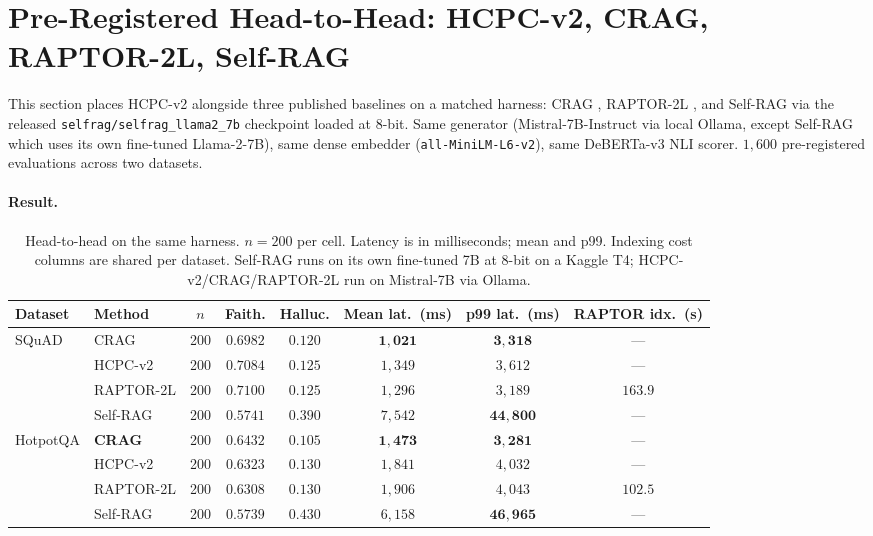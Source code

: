 \section{Pre-Registered Head-to-Head: HCPC-v2, CRAG, RAPTOR-2L, Self-RAG}
\label{sec:headtohead}

This section places HCPC-v2 alongside three published baselines on
a matched harness:
CRAG \citep{yan2024crag},
RAPTOR-2L \citep{sarthi2024raptor},
and Self-RAG via the released \texttt{selfrag/selfrag\_llama2\_7b}
checkpoint \citep{asai2024selfrag} loaded at 8-bit. Same generator
(Mistral-7B-Instruct via local Ollama, except Self-RAG which uses
its own fine-tuned Llama-2-7B), same dense embedder
(\texttt{all-MiniLM-L6-v2}), same DeBERTa-v3 NLI scorer.
$1{,}600$ pre-registered evaluations across two datasets.

\paragraph{Result.}

\begin{table}[H]
\centering
\small
\caption{Head-to-head on the same harness. $n{=}200$ per cell.
Latency is in milliseconds; mean and p99. Indexing cost columns are
shared per dataset. Self-RAG runs on its own fine-tuned 7B at 8-bit
on a Kaggle T4; HCPC-v2/CRAG/RAPTOR-2L run on Mistral-7B via Ollama.}
\label{tab:h2h}
\begin{tabular}{llcccccc}
\toprule
Dataset & Method & $n$ & Faith. & Halluc. &
Mean lat.\ (ms) & p99 lat.\ (ms) & RAPTOR idx.\ (s) \\
\midrule
\multirow{4}{*}{SQuAD}
  & CRAG       & 200 & $0.6982$ & $0.120$ & $\mathbf{1{,}021}$ & $\mathbf{3{,}318}$ & --- \\
  & HCPC-v2    & 200 & $0.7084$ & $0.125$ & $1{,}349$ & $3{,}612$ & --- \\
  & RAPTOR-2L  & 200 & $\mathbf{0.7100}$ & $0.125$ & $1{,}296$ & $3{,}189$ & $163.9$ \\
  & Self-RAG   & 200 & $0.5741$ & $\mathbf{0.390}$ & $7{,}542$ & $\mathbf{44{,}800}$ & --- \\
\midrule
\multirow{4}{*}{HotpotQA}
  & \textbf{CRAG}       & 200 & $\mathbf{0.6432}$ & $\mathbf{0.105}$ & $\mathbf{1{,}473}$ & $\mathbf{3{,}281}$ & --- \\
  & HCPC-v2    & 200 & $0.6323$ & $0.130$ & $1{,}841$ & $4{,}032$ & --- \\
  & RAPTOR-2L  & 200 & $0.6308$ & $0.130$ & $1{,}906$ & $4{,}043$ & $102.5$ \\
  & Self-RAG   & 200 & $0.5739$ & $0.430$ & $6{,}158$ & $\mathbf{46{,}965}$ & --- \\
\bottomrule
\end{tabular}
\end{table}

